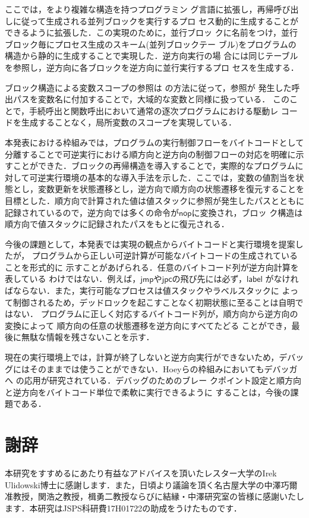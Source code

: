 \documentclass[submit,PRO]{ipsj}
\newcommand{\bcode}[1]{$\mathsf{#1}$}
\begin{document}
ここでは，\cite{DBLP:conf/rc/IkedaY20}をより複雑な構造を持つプログラミン
グ言語に拡張し，再帰呼び出しに従って生成される並列ブロックを実行するプロ
セス動的に生成することができるように拡張した．この実現のために，並行ブロッ
クに名前をつけ，並行ブロック毎にプロセス生成のスキーム(並列ブロックテー
ブル)をプログラムの構造から静的に生成することで実現した．逆方向実行の場
合には同じテーブルを参照し，逆方向に各ブロックを逆方向に並行実行するプロ
セスを生成する．

ブロック構造による変数スコープの参照は
\cite{DBLP:journals/corr/abs-1808-08651,Hoey20PHD}の方法に従って，参照が
発生した呼出パスを変数名に付加することで，大域的な変数と同様に扱っている．
このことで，手続呼出と関数呼出において通常の逐次プログラムにおける駆動レ
コードを生成することなく，局所変数のスコープを実現している．

本発表における枠組みでは，プログラムの実行制御フローをバイトコードとして
分離することで可逆実行における順方向と逆方向の制御フローの対応を明確に示
すことができた．ブロックの再帰構造を導入することで，実際的なプログラムに
対して可逆実行環境の基本的な導入手法を示した．ここでは，変数の値割当を状
態とし，変数更新を状態遷移とし，逆方向で順方向の状態遷移を復元することを
目標とした．順方向で計算された値は値スタックに参照が発生したパスとともに
記録されているので，逆方向では多くの命令が\bcode{nop}に変換され，ブロッ
ク構造は順方向で値スタックに記録されたパスをもとに復元される．

今後の課題として，本発表では実現の観点からバイトコードと実行環境を提案したが，
プログラムから正しい可逆計算が可能なバイトコードの生成されていることを形式的に
示すことがあげられる．任意のバイトコード列が逆方向計算を表している
わけではない．例えば，\bcode{jmp}や\bcode{jpc}の飛び先には必ず，\bcode{label}
がなければならない．また，実行可能なプロセスは値スタックやラベルスタックに
よって制御されるため，デッドロックを起こすことなく初期状態に至ることは自明ではない．
プログラムに正しく対応するバイトコード列が，順方向から逆方向の変換によって
順方向の任意の状態遷移を逆方向にすべてたどる
ことができ，最後に無駄な情報を残さないことを示す．

現在の実行環境上では，計算が終了しないと逆方向実行ができないため，デバッ
グにはそのままでは使うことができない．Hoeyらの枠組みにおいてもデバッガへ
の応用が研究されている\cite{DBLP:conf/rc/HoeyU19}．デバッグのためのブレー
クポイント設定と順方向と逆方向をバイトコード単位で柔軟に実行できるように
することは，今後の課題である．

\section*{謝辞}

本研究をすすめるにあたり有益なアドバイスを頂いたレスター大学のIrek
Ulidowski博士に感謝します．また，日頃より議論を頂く名古屋大学の中澤巧爾
准教授，関浩之教授，楫勇二教授ならびに結縁・中澤研究室の皆様に感謝いたし
ます．本研究はJSPS科研費17H01722の助成をうけたものです．



\end{document}
